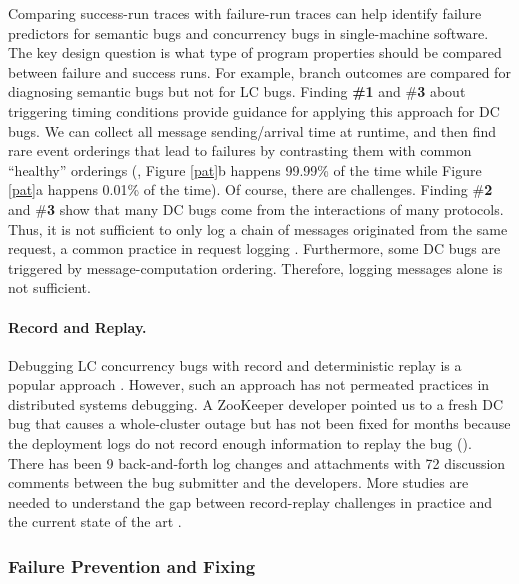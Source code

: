 Comparing success-run traces with failure-run traces can help identify
failure predictors for semantic bugs \cite{liblit03} 
and concurrency bugs \cite{cci.oopsla10}
in single-machine software.  The key
design question is what type of program properties should be
compared between failure and success runs. For example, branch
outcomes are compared for diagnosing semantic bugs but not for LC bugs.
%
%
Finding {\bf \#1} and \#{\bf 3} about triggering timing conditions
provide guidance for applying this approach for DC bugs. We can
collect all message sending/arrival time at runtime, and then find
rare event orderings that lead to failures by contrasting them with
common ``healthy'' orderings (\eg, Figure \ref{pat}b happens 99.99\%
of the time while Figure \ref{pat}a happens 0.01\% of the time).
%
%
Of course, there are challenges. Finding \#{\bf 2} and \#{\bf 3}
show that many DC bugs come from the interactions of
many protocols. Thus, it is not sufficient to only log a chain of messages
originated from the same request, a common practice in request logging
\cite{Chow+14-Mysterymachine}.  Furthermore, some DC bugs are triggered by
message-computation ordering. Therefore, logging messages alone is
not sufficient.

\paragraph{Record and Replay.}

Debugging LC concurrency bugs with record and deterministic replay is
a popular approach \cite{quickrec.isca13,
  doubleplay.asplos11}.  However, such an approach has not permeated
practices in distributed systems debugging.  A ZooKeeper developer
pointed us to a fresh DC bug that causes a whole-cluster outage but
has not been fixed for months because the deployment logs do not
record enough information to replay the bug ().  There has
been 9 back-and-forth log changes and attachments with 72 discussion
comments between the bug submitter and the developers.  More studies
are needed to understand the gap between record-replay challenges in
practice and the current state of the art \cite{Geels+06-Liblog,
  Liu+07-WiDS}.

\subsubsection{Failure Prevention and Fixing}
\label{less-runtime}

